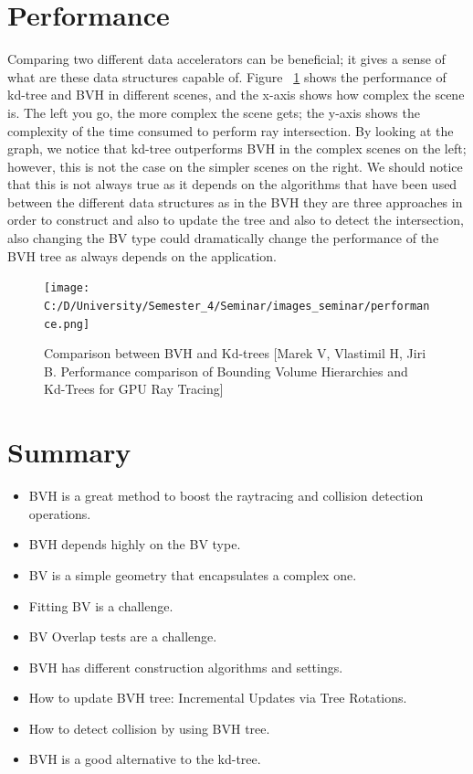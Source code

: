 \documentclass[11pt,a4paper]{article}
\begin{document}
	\section{Performance}
	Comparing two different data accelerators can be beneficial; it gives a sense of what are these data structures capable of. Figure ~\ref{fig:5} shows the performance of kd-tree and BVH in different scenes, and the x-axis shows how complex the scene is. The left you go, the more complex the scene gets; the y-axis shows the complexity of the time consumed to perform ray intersection. By looking at the graph, we notice that kd-tree outperforms BVH in the complex scenes on the left; however, this is not the case on the simpler scenes on the right. We should notice that this is not always true as it depends on the algorithms that have been used between the different data structures as in the BVH they are three approaches in order to construct and also to update the tree and also to detect the intersection, also changing the BV type could dramatically change the performance of the BVH tree as always depends on the application.
	
	\begin{figure}[h]
		\begin{center}
			\texttt{[image: C:/D/University/Semester\_4/Seminar/images\_seminar/performance.png]}
			
			\caption{Comparison between BVH and Kd-trees [Marek V, Vlastimil H, Jiri B. Performance comparison of Bounding Volume Hierarchies and Kd-Trees for GPU Ray Tracing]}
			\label{fig:5}
		\end{center}
	\end{figure}
	
	\clearpage
	\section{Summary}
	\begin{itemize}
		
		
		\item BVH is a great method to boost the raytracing and collision detection operations. 
		\item BVH depends highly on the BV type.
		\item BV is a simple geometry that encapsulates a complex one.
		\item Fitting BV is a challenge.
		\item BV Overlap tests are a challenge.
		\item BVH has different construction algorithms and settings. 
		\item How to update BVH tree: Incremental Updates via Tree Rotations.
		\item How to detect collision by using BVH tree. 
		\item BVH is a good alternative to the kd-tree. 
		
		
	\end{itemize} 
	\clearpage
\end{document}
